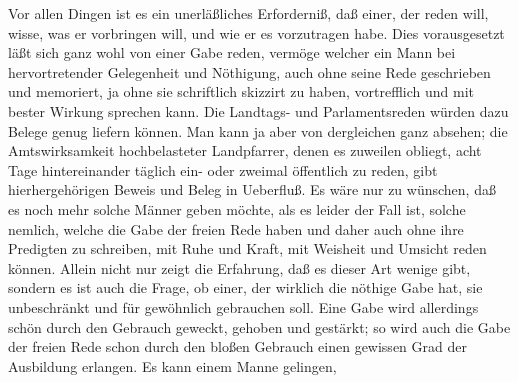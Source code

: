 Vor allen Dingen ist es ein unerläßliches Erforderniß, daß einer, der reden will, wisse, was er vorbringen will, und wie er es vorzutragen habe. Dies vorausgesetzt läßt sich ganz wohl von einer Gabe reden, vermöge welcher ein Mann bei hervortretender Gelegenheit und Nöthigung, auch ohne seine Rede geschrieben und memoriert, ja ohne sie schriftlich skizzirt zu haben, vortrefflich und mit bester Wirkung sprechen kann. Die Landtags- und Parlamentsreden würden dazu Belege genug liefern können. Man kann ja aber von dergleichen ganz absehen; die Amtswirksamkeit hochbelasteter Landpfarrer, denen es zuweilen obliegt, acht Tage hintereinander täglich ein- oder zweimal öffentlich zu reden, gibt hierhergehörigen Beweis und Beleg in Ueberfluß. Es wäre nur zu wünschen, daß es noch mehr solche Männer geben möchte, als es leider der Fall ist, solche nemlich, welche die Gabe der freien Rede haben und daher auch ohne ihre Predigten zu schreiben, mit Ruhe und Kraft, mit Weisheit und Umsicht reden können. Allein nicht nur zeigt die Erfahrung, daß es dieser Art wenige gibt, sondern es ist auch die Frage, ob einer, der wirklich die nöthige Gabe hat, sie unbeschränkt und für gewöhnlich gebrauchen soll. Eine Gabe wird allerdings schön durch den Gebrauch geweckt, gehoben und gestärkt; so wird auch die Gabe der freien Rede schon durch den bloßen Gebrauch einen gewissen Grad der Ausbildung erlangen. Es kann einem Manne gelingen,
